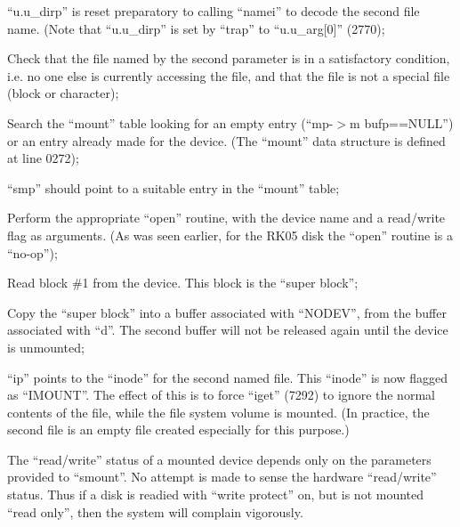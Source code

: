 \item[6096:] ``u.u\_dirp'' is  reset  preparatory
to  calling ``namei'' to decode the
second  file  name.   (Note   that
``u.u\_dirp''  is  set  by ``trap'' to
``u.u\_arg[0]'' (2770);

\item[6100:] Check that the file named by  the
      second  parameter  is in a satisfactory condition,  i.e.  no  one
      else  is  currently accessing the
      file, and that the file is not  a
      special  file  (block  or character);

\item[6103:] Search the ``mount'' table  looking
  for      an      empty      entry
  (``mp-$>$m bufp==NULL'') or an  entry
  already   made  for  the  device.
  (The ``mount''  data  structure  is
  defined at line 0272);


\item[6111:] ``smp'' should point to a  suitable
entry in the ``mount'' table;

\item[6113:] Perform  the  appropriate  ``open''
routine, with the device name and
a read/write flag  as  arguments.
(As  was  seen  earlier,  for the
RK05 disk the ``open'' routine is a
``no-op'');


\item[6116:] Read block \#1 from the device.
This block is the ``super block'';

\item[6124:] Copy the ``super block'' into a
buffer associated with ``NODEV'',
from the buffer associated with
``d''. The second buffer will not
 be released again until the device is unmounted;

\item[6130:] ``ip'' points to  the  ``inode''  for
the   second  named  file.   This
``inode''   is   now   flagged   as
``IMOUNT''.  The  effect of this is
to force ``iget'' (7292) to  ignore
the  normal contents of the file,
while the file system  volume  is
mounted. (In practice, the second
file is  an  empty  file  created
especially for this purpose.)
\ed



\bd
\item[1.] The ``read/write'' status of a mounted
device  depends  only on the parameters
provided to ``smount''.   No  attempt  is
made to sense the hardware ``read/write''
status. Thus if a disk is readied  with
``write  protect'' on, but is not mounted
``read only'', then the system will  complain vigorously.

